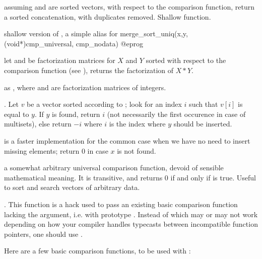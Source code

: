 assuming  and  are sorted vectors, with respect to the 
comparison function, return a sorted concatenation, with duplicates removed.
Shallow function.

 shallow version of , a
simple alias for
\bprog
  merge_sort_uniq(x,y, (void*)cmp_universal, cmp_nodata)
@eprog

let  and  be factorization matrices for $X$ and $Y$
sorted with respect to the comparison function  (see
), returns the factorization of $X * Y$.

as , where  and  are factorization matrices of
integers.

.\hfil\break
Let $v$ be a vector sorted according to ; look for an
index $i$ such that  $v[i]$ is equal to $y$. If $y$ is found, return $i$
(not necessarily the first occurence in case of multisets), else return $-i$
where $i$ is the index where $y$ should be inserted.

 is a faster
implementation for the common case 
when we have no need to insert missing elements; return $0$ in case $x$
is not found.


 a somewhat arbitrary universal
comparison function, devoid of sensible mathematical meaning. It is
transitive, and returns 0 if and only if  is true.
Useful to sort and search vectors of arbitrary data.

. This function is a hack
used to pass an existing basic comparison function lacking the 
argument, i.e. with prototype . Instead of
 which may or may not work depending on how your
compiler handles typecasts between incompatible function pointers, one should
use .

Here are a few basic comparison functions, to be used with :


